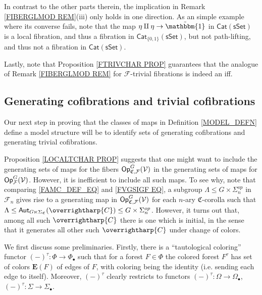 \documentclass[a4paper,10pt
,draft
]{article}%
\renewcommand{\F}{\mathcal F}
\renewcommand{\1}{\eta}%
\newcommand{\vect}[1]{\text{\overrightharp{\ensuremath{#1}}}}
\begin{document}
\begin{remark}
In contrast to the other parts therein,
the implication in Remark \ref{FIBERGLMOD REM}(iii) 
only holds in one direction. 
As an simple example where its converse fails, 
note that the map $\eta \amalg \eta \to \tilde{\mathbbm{1}}$
in $\mathsf{Cat}(\mathsf{sSet})$ is a local fibration, 
and thus a fibration in $\mathsf{Cat}_{\{0,1\}}(\mathsf{sSet})$,
but not path-lifting, and thus not a fibration in $\mathsf{Cat}(\mathsf{sSet})$.

Lastly, note that Proposition \ref{FTRIVCHAR PROP}
guarantees that the analogue of Remark \ref{FIBERGLMOD REM}
for $\F$-trivial fibrations is indeed an iff.
\end{remark}




\subsection{Generating cofibrations and trivial cofibrations}

Our next step in proving that the classes of maps in Definition \ref{MODEL_DEFN}
define a model structure will be to identify sets of generating cofibrations and generating trivial cofibrations.

Proposition \ref{LOCALTCHAR PROP} suggests that one might want to include the generating sets of maps for the fibers 
$\mathsf{Op}^G_{\mathfrak{C},\F}(\V)$
in the generating sets of maps for 
$\mathsf{Op}^G_{\F}(\V)$.
However, it is inefficient to include all such maps.
To see why, note that comparing
\eqref{FAMC_DEF_EQ} and \eqref{FVGSIGF EQ},
a subgroup
$\Lambda \leq G \times \Sigma_n^{op}$ in $\F_n$
gives rise to a generating map in
$\mathsf{Op}^G_{\mathfrak{C},\F}(\V)$
for each $n$-ary $\mathfrak{C}$-corolla such that
$\Lambda \leq \mathsf{Aut}_{G\ltimes \Sigma_{\mathfrak{C}}}(\vect{C})
\leq G \times \Sigma_n^{op}$.
However, it turns out that, among all such $\vect{C}$ there is one which is initial, in the sense that it generates all other such 
$\vect{C}$ under change of colors.


We first discuss some preliminaries.
Firstly, there is a ``tautological coloring'' functor
$(-)^{\tau} \colon \Phi \to \Phi_{\bullet}$
such that for a forest 
$F \in \Phi$
the colored forest $F^{\tau}$
has set of colors $\boldsymbol{E}(F)$ of edges of $F$,
with coloring being the identity (i.e. sending each edge to itself).
Moreover, $(-)^{\tau}$ clearly restricts to functors
$(-)^{\tau} \colon \Omega \to \Omega_{\bullet}$,
$(-)^{\tau} \colon \Sigma \to \Sigma_{\bullet}$.
\end{document}
